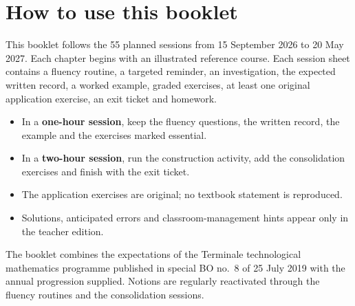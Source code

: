 \chapter*{How to use this booklet}
This booklet follows the 55 planned sessions from 15 September 2026 to 20 May 2027. Each chapter begins with an illustrated reference course. Each session sheet contains a fluency routine, a targeted reminder, an investigation, the expected written record, a worked example, graded exercises, at least one original application exercise, an exit ticket and homework.

\begin{itemize}
\item In a \textbf{one-hour session}, keep the fluency questions, the written record, the example and the exercises marked essential.
\item In a \textbf{two-hour session}, run the construction activity, add the consolidation exercises and finish with the exit ticket.
\item The application exercises are original; no textbook statement is reproduced.
\item Solutions, anticipated errors and classroom-management hints appear only in the teacher edition.
\end{itemize}

\begin{keypoint}
The booklet combines the expectations of the Terminale technological mathematics programme published in special BO no.~8 of 25 July 2019 with the annual progression supplied. Notions are regularly reactivated through the fluency routines and the consolidation sessions.
\end{keypoint}

\tableofcontents
